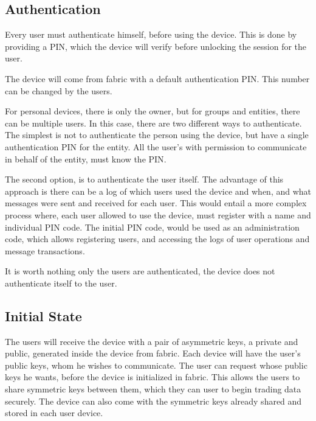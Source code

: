 \subsection{Authentication}\label{chap:problem:services:auth}
Every user must authenticate himself, before using the device. This is done by providing a \ac{PIN}, which the device will verify before unlocking the session for the user.

The device will come from fabric with a default authentication \ac{PIN}. This number can be changed by the users.

For personal devices, there is only the owner, but for groups and entities, there can be multiple users. In this case, there are two different ways to authenticate. The simplest is not to authenticate the person using the device, but have a single authentication \ac{PIN} for the entity. All the user's with permission to communicate in behalf of the entity, must know the \ac{PIN}.

The second option, is to authenticate the user itself. The advantage of this approach is there can be a log of which users used the device and when, and what messages were sent and received for each user.
This would entail a more complex process where, each user allowed to use the device, must register with a name and individual \ac{PIN} code. The initial \ac{PIN} code, would be used as an administration code, which allows registering users, and accessing the logs of user operations and message transactions.

It is worth nothing only the users are authenticated, the device does not authenticate itself to the user.

\subsection{Initial State}\label{chap:problem:scenarios:init}

The users will receive the device with a pair of asymmetric keys, a private and public, generated inside the device from fabric.
Each device will have the user's public keys, whom he wishes to communicate.
The user can request whose public keys he wants, before the device is initialized in fabric.
This allows the users to share symmetric keys between them, which they can user to begin trading data securely.
The device can also come with the symmetric keys already shared and stored in each user device.

